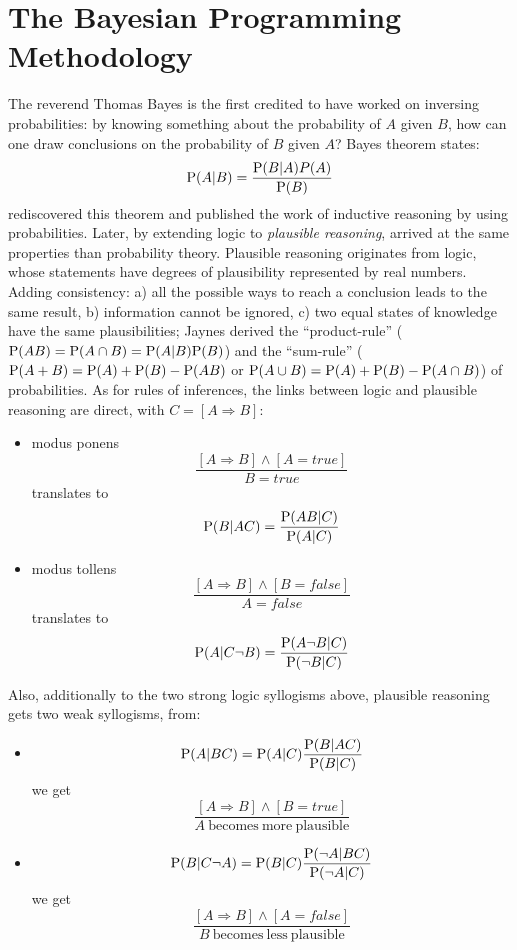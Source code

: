 \section{The Bayesian Programming Methodology}
The reverend Thomas Bayes is the first credited to have worked on inversing probabilities: by knowing something about the probability of $A$ given $B$, how can one draw conclusions on the probability of $B$ given $A$? Bayes theorem states: $$\mathrm{P}(A|B) = \frac{\mathrm{P}(B|A)P(A)}{\mathrm{P}(B)}$$
\cite{Laplace} rediscovered this theorem and published the work of inductive reasoning by using probabilities. Later, by extending logic to \textit{plausible reasoning}, \cite{Jaynes} arrived at the same properties than \cite{Kolmogorov33} probability theory. Plausible reasoning originates from logic, whose statements have degrees of plausibility represented by real numbers. %
Adding consistency: a) all the possible ways to reach a conclusion leads to the same result, b) information cannot be ignored, c) two equal states of knowledge have the same plausibilities; Jaynes derived the ``product-rule'' ($\mathrm{P}(AB)=\mathrm{P}(A\cap B)=\mathrm{P}(A|B)\mathrm{P}(B)$) and the ``sum-rule'' ($\mathrm{P}(A+B)=\mathrm{P}(A)+\mathrm{P}(B)-\mathrm{P}(AB)$ or $\mathrm{P}(A\cup B) = \mathrm{P}(A)+\mathrm{P}(B)-\mathrm{P}(A\cap B)$) of probabilities. As for rules of inferences, the links between logic and plausible reasoning are direct, with $C=[A\Rightarrow B]$:
\begin{itemize}
    \item modus ponens $$\frac{[A\Rightarrow B] \wedge [A=true]}{B=true}$$ translates to $$\mathrm{P}(B|AC)=\frac{\mathrm{P}(AB|C)}{\mathrm{P}(A|C)}$$
    \item modus tollens $$\frac{[A\Rightarrow B] \wedge [B=false]}{A=false}$$ translates to $$\mathrm{P}(A|C\neg B)=\frac{\mathrm{P}(A \neg B|C)}{\mathrm{P}(\neg B|C)}$$
\end{itemize}
Also, additionally to the two strong logic syllogisms above, plausible reasoning gets two weak syllogisms, from:
\begin{itemize}
    \item $$\mathrm{P}(A|BC)=\mathrm{P}(A|C)\frac{\mathrm{P}(B|AC)}{\mathrm{P}(B|C)}$$ we get $$\frac{[A\Rightarrow B] \wedge [B=true]}{A\ \mathrm{becomes\ more\ plausible}}$$
    \item $$\mathrm{P}(B| C\neg A)=\mathrm{P}(B|C)\frac{\mathrm{P}(\neg A|BC)}{\mathrm{P}(\neg A|C)}$$ we get $$\frac{[A\Rightarrow B] \wedge [A=false]}{B\ \mathrm{becomes\ less\ plausible}}$$
\end{itemize}

